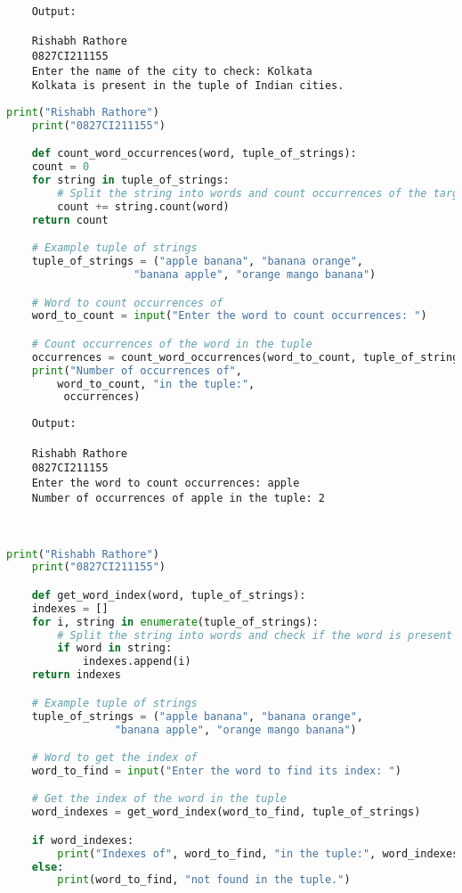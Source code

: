 \documentclass{report}
\begin{document}
\begin{verbatim}
	Output:

	Rishabh Rathore
	0827CI211155
	Enter the name of the city to check: Kolkata
	Kolkata is present in the tuple of Indian cities.

\end{verbatim}


\newpage


\sol 
\begin{lstlisting}[language=Python]
	print("Rishabh Rathore")
	print("0827CI211155")

	def count_word_occurrences(word, tuple_of_strings):
    count = 0
    for string in tuple_of_strings:
        # Split the string into words and count occurrences of the target word
        count += string.count(word)
    return count

	# Example tuple of strings
	tuple_of_strings = ("apple banana", "banana orange", 
					"banana apple", "orange mango banana")

	# Word to count occurrences of
	word_to_count = input("Enter the word to count occurrences: ")

	# Count occurrences of the word in the tuple
	occurrences = count_word_occurrences(word_to_count, tuple_of_strings)
	print("Number of occurrences of", 
		word_to_count, "in the tuple:",
		 occurrences)

\end{lstlisting}

\begin{verbatim}
	Output:

	Rishabh Rathore
	0827CI211155
	Enter the word to count occurrences: apple
	Number of occurrences of apple in the tuple: 2



\end{verbatim}


\newpage


\sol 
\begin{lstlisting}[language=Python]
	print("Rishabh Rathore")
	print("0827CI211155")

	def get_word_index(word, tuple_of_strings):
    indexes = []
    for i, string in enumerate(tuple_of_strings):
        # Split the string into words and check if the word is present
        if word in string:
            indexes.append(i)
    return indexes

	# Example tuple of strings
	tuple_of_strings = ("apple banana", "banana orange",
				 "banana apple", "orange mango banana")

	# Word to get the index of
	word_to_find = input("Enter the word to find its index: ")

	# Get the index of the word in the tuple
	word_indexes = get_word_index(word_to_find, tuple_of_strings)

	if word_indexes:
		print("Indexes of", word_to_find, "in the tuple:", word_indexes)
	else:
		print(word_to_find, "not found in the tuple.")

\end{lstlisting}
\end{document}
